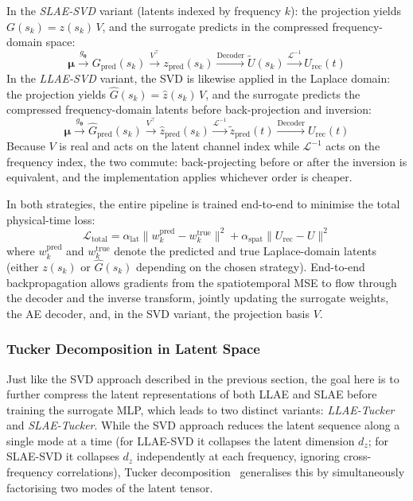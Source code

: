﻿\documentclass[a4paper,12pt]{article}
\theoremstyle{definition}
\theoremstyle{remark}
\newcommand{\vmu}{\bm{\mu}}
\begin{document}
In the \emph{SLAE-SVD} variant (latents indexed by frequency $k$): the projection yields $G(s_k) = z(s_k)\,V$, and the surrogate predicts in the compressed frequency-domain space:
\begin{equation}
    \vmu \xrightarrow{g_{\bm{\theta}}} G_{\text{pred}}(s_k) \xrightarrow{V^\top} z_{\text{pred}}(s_k) \xrightarrow{\text{Decoder}} \tilde{U}(s_k) \xrightarrow{\mathcal{L}^{-1}} U_{\text{rec}}(t)
\end{equation}
In the \emph{LLAE-SVD} variant, the SVD is likewise applied in the Laplace domain: the projection yields $\hat{G}(s_k) = \hat{z}(s_k)\,V$, and the surrogate predicts the compressed frequency-domain latents before back-projection and inversion:
\begin{equation}
    \vmu \xrightarrow{g_{\bm{\theta}}} \hat{G}_{\text{pred}}(s_k) \xrightarrow{V^\top} \hat{z}_{\text{pred}}(s_k) \xrightarrow{\mathcal{L}^{-1}} \tilde{z}_{\text{pred}}(t) \xrightarrow{\text{Decoder}} U_{\text{rec}}(t)
\end{equation}
Because $V$ is real and acts on the latent channel index while $\mathcal{L}^{-1}$ acts on the frequency index, the two commute: back-projecting before or after the inversion is equivalent, and the implementation applies whichever order is cheaper.

In both strategies, the entire pipeline is trained end-to-end to minimise the total physical-time loss:
\begin{equation}
    \mathcal{L}_{\mathrm{total}} = \alpha_{\mathrm{lat}} \|w_k^{\text{pred}} - w_k^{\text{true}}\|^2 + \alpha_{\mathrm{spat}} \|U_{\text{rec}} - U\|^2
\end{equation}
where $w_k^{\text{pred}}$ and $w_k^{\text{true}}$ denote the predicted and true Laplace-domain latents (either $z(s_k)$ or $\hat{G}(s_k)$ depending on the chosen strategy). End-to-end backpropagation allows gradients from the spatiotemporal MSE to flow through the decoder and the inverse transform, jointly updating the surrogate weights, the AE decoder, and, in the SVD variant, the projection basis $V$.

\subsubsection{Tucker Decomposition in Latent Space}
\label{sec:tucker_compression}

Just like the SVD approach described in the previous section, the goal here is to further compress the latent representations of both LLAE and SLAE before training the surrogate MLP, which leads to two distinct variants: \emph{LLAE-Tucker} and \emph{SLAE-Tucker}. While the SVD approach reduces the latent sequence along a single mode at a time (for LLAE-SVD it collapses the latent dimension $d_z$; for SLAE-SVD it collapses $d_z$ independently at each frequency, ignoring cross-frequency correlations), Tucker decomposition~\cite{kolda2009tensor} generalises this by simultaneously factorising two modes of the latent tensor.
\end{document}
